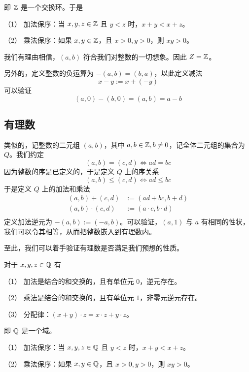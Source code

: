 即 $\ZZ$ 是一个交换环。于是

\begin{theorem}[$\ZZ$ 是有序域]
	（1） 加法保序：当 $x,y,z\in \mathbb{Z}$ 且 $y<z$ 时，$x+y<x+z$。

	（2） 乘法保序：如果 $x,y\in \mathbb{Z}$，且 $x>0,y>0$，则 $xy>0$。
\end{theorem}

我们有理由相信，$(a,b)$ 符合我们对整数的一切想象。因此 $Z = \mathbb{Z}$。

另外的，定义整数的负运算为 $-(a,b) = (b,a)$，以此定义减法
$$x - y := x + (-y)$$
可以验证
$$(a,0) - (b,0) = (a,b) = a - b$$

\subsection{有理数}

类似的，记整数的二元组 $(a,b)$，其中 $a,b\in \mathbb{Z},b\ne 0$，记全体二元组的集合为 $Q$。我们约定
$$(a,b) = (c,d) \Leftrightarrow ad = bc$$
因为整数的序是已定义的，于是定义 $Q$ 上的序关系
$$(a,b) \leqslant (c,d) \Leftrightarrow ad \leqslant bc$$
于是定义 $Q$ 上的加法和乘法
\begin{equation*}
	\begin{aligned}
		(a,b) + (c,d) &:= (ad+bc,b+d)\\
		(a,b) \cdot (c,d) &:= (a \cdot c,b \cdot d)\\
	\end{aligned}
\end{equation*}
定义加法逆元为 $-(a,b) := (-a,b)$。可以验证，$(a,1)$ 与 $a$ 有相同的性状，我们可以令其相等，从而把整数嵌入到有理数内。

至此，我们可以着手验证有理数是否满足我们预想的性质。

\begin{theorem}[$\QQ$ 的代数算律]
	对于 $x,y,z\in \mathbb{Q}$ 有

	（1） 加法是结合的和交换的，且有单位元 $0$，逆元存在。

	（2） 乘法是结合的和交换的，且有单位元 $1$，非零元逆元存在。

	（3） 分配律：$(x+y) \cdot  z = x \cdot z + y\cdot z$。
\end{theorem}

即 $\QQ$ 是一个域。

\begin{theorem}[$\QQ$ 是有序域]
	（1） 加法保序：当 $x,y,z\in \mathbb{Q}$ 且 $y<z$ 时，$x+y<x+z$。

	（2） 乘法保序：如果 $x,y\in \mathbb{Q}$，且 $x>0,y>0$，则 $xy>0$。
\end{theorem}


